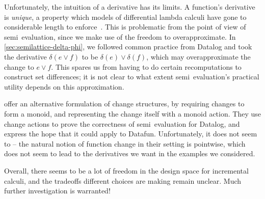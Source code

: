 Unfortunately, the intuition of a derivative has its limits. A function's
derivative is \emph{unique}, a property which models of differential lambda
calculi have gone to considerable length to
enforce~\cite{differential-categories}. This is problematic from the point of
view of semi\naive\ evaluation, since we make use of the freedom to
overapproximate.
%
In \cref{sec:semilattice-delta-phi}, we followed common practice from Datalog
and took the derivative $\delta(e \vee f)$ to be $\delta(e) \vee \delta(f)$,
which may overapproximate the change to $e \vee f$.
%
This spares us from having to do certain recomputations to construct set
differences; it is not clear to what extent semi\naive\ evaluation's practical
utility depends on this approximation.

\citet{DBLP:conf/esop/Alvarez-Picallo19} offer an alternative
formulation of change structures, by requiring changes to form a
monoid, and representing the change itself with a monoid action. They
use change actions to prove the correctness of semi\naive\ evaluation
for Datalog, and express the hope that it could apply to Datafun.
Unfortunately, it does not seem to -- the natural notion of function
change in their setting is pointwise, which does not seem to lead to
the derivatives we want in the examples we considered.

Overall, there seems to be a lot of freedom in the design space for
incremental calculi, and the tradeoffs different choices are making
remain unclear. Much further investigation is warranted!






